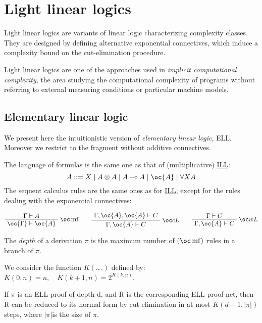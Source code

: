 \chapter{Light linear logics}\label{light-linear-logics}

Light linear logics are variants of linear logic characterizing
complexity classes. They are designed by defining alternative
exponential connectives, which induce a complexity bound on the
cut-elimination procedure.

Light linear logics are one of the approaches used in \emph{implicit
computational complexity}, the area studying the computational
complexity of programs without referring to external measuring
conditions or particular machine models.

\section{Elementary linear logic}\label{elementary-linear-logic}

We present here the intuitionistic version of \emph{elementary linear
logic}, ELL. Moreover we restrict to the fragment without additive
connectives.

The language of formulas is the same one as that of (multiplicative)
\hyperref[intuitionistic-linear-logic]{ILL}:
\begin{equation*}
A ::= X \mid A\tens A \mid A\limp A  \mid \oc{A} \mid \forall X A
\end{equation*}
The sequent calculus rules are the same ones as for
\hyperref[intuitionistic-linear-logic]{ILL}, except for the rules dealing
with the exponential connectives:

\(\AxRule{\Gamma\vdash A}
\LabelRule{\oc\rulename{mf} }
\UnaRule{\oc{\Gamma}\vdash\oc{A}}
\DisplayProof
\qquad
\AxRule{\Gamma,\oc{A},\oc{A}\vdash C}
\LabelRule{\oc c L}
\UnaRule{\Gamma,\oc{A}\vdash C}
\DisplayProof
\qquad
\AxRule{\Gamma\vdash C}
\LabelRule{\oc w L}
\UnaRule{\Gamma,\oc{A}\vdash C}
\DisplayProof\)

The \emph{depth} of a derivation \(\pi\) is the maximum number of
\((\oc\rulename{mf})\) rules in a branch of \(\pi\).

We consider the function \(K(.,.)\) defined by:\\
\(K(0,n)=n, \quad K(k+1,n)=2^{K(k,n)}\).

\begin{theorem}
If $\pi$ is an ELL proof of depth d, and R is the corresponding ELL proof-net, then R can be reduced to its normal form by cut elimination in at most $ K(d+1,|\pi|)$ steps, where $|\pi|$is the size of $\pi$.
\end{theorem}

